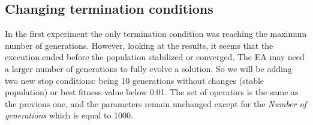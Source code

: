 \documentclass[sigconf]{acmart}
\begin{document}


\subsection{Changing termination conditions} \label{E2}

In the first experiment the only termination condition was reaching the maximum 
number of generations. %
However, looking at the results, it seems that the 
execution ended before the population stabilized or converged.
The EA may need a 
larger number of generations to fully evolve a solution.
So we will be adding two new stop 
conditions: being 10 generations without changes (stable population) or best 
fitness value below 0.01. 
The set of operators is the same as the previous one, and the parameters remain 
unchanged except for the \textit{Number of generations} which is equal to 1000. 
\end{document}
